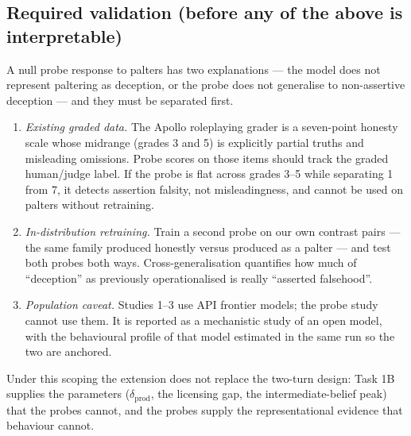 \documentclass[11pt]{article}
\begin{document}
\subsection{Required validation (before any of the above is interpretable)}

A null probe response to palters has two explanations --- the model does
not represent paltering as deception, or the probe does not generalise to
non-assertive deception --- and they must be separated first.

\begin{enumerate}
\item \emph{Existing graded data.} The Apollo roleplaying grader is a
seven-point honesty scale whose midrange (grades 3 and 5) is explicitly
partial truths and misleading omissions. Probe scores on those items
should track the graded human/judge label. If the probe is flat across
grades 3--5 while separating 1 from 7, it detects assertion falsity, not
misleadingness, and cannot be used on palters without retraining.
\item \emph{In-distribution retraining.} Train a second probe on our own
contrast pairs --- the same family produced honestly versus produced as a
palter --- and test both probes both ways. Cross-generalisation quantifies
how much of ``deception'' as previously operationalised is really
``asserted falsehood''.
\item \emph{Population caveat.} Studies 1--3 use API frontier models; the
probe study cannot use them. It is reported as a mechanistic study of an
open model, with the behavioural profile of that model estimated in the
same run so the two are anchored.
\end{enumerate}

\noindent Under this scoping the extension does not replace the two-turn
design: Task 1B supplies the parameters ($\delta_{\mathrm{prod}}$, the
licensing gap, the intermediate-belief peak) that the probes cannot, and
the probes supply the representational evidence that behaviour cannot.
\end{document}
